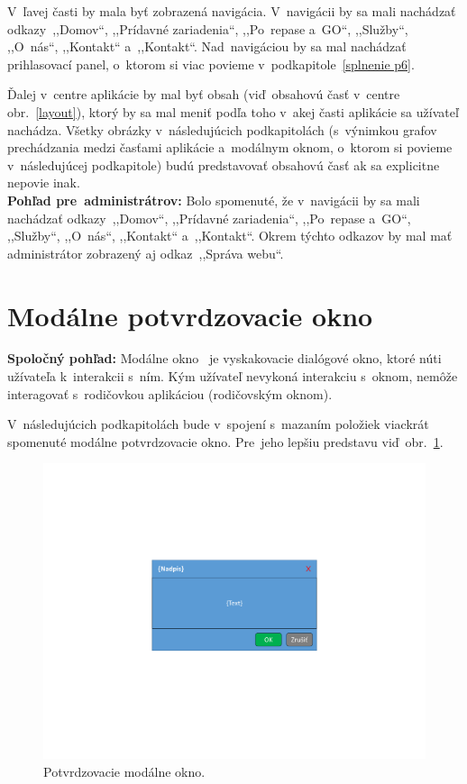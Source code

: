 V~ľavej časti by mala byť zobrazená navigácia. V~navigácii by sa mali nachádzať odkazy~,,Domov``, ,,Prídavné zariadenia``, ,,Po~repase a~GO``, ,,Služby``, ,,O~nás``, ,,Kontakt`` a~,,Kontakt``. Nad~navigáciou by sa mal nachádzať prihlasovací panel, o~ktorom si viac povieme v~podkapitole~\ref{splnenie p6}.

Ďalej v~centre aplikácie by mal byť obsah (viď~obsahovú časť v~centre obr.~\ref{layout}), ktorý by sa mal meniť podľa toho v~akej časti aplikácie sa užívateľ nachádza. Všetky obrázky v~následujúcich podkapitolách (s~výnimkou grafov prechádzania medzi časťami aplikácie a~modálnym oknom, o~ktorom si povieme v~následujúcej podkapitole) budú predstavovať obsahovú časť ak sa explicitne nepovie inak.\\

\textbf{Pohľad pre~administrátrov:} Bolo spomenuté, že v~navigácii by sa mali nachádzať odkazy~,,Domov``, ,,Prídavné zariadenia``, ,,Po~repase a~GO``, ,,Služby``, ,,O~nás``, ,,Kontakt`` a~,,Kontakt``. Okrem týchto odkazov by mal mať administrátor zobrazený aj odkaz~,,Správa webu``.

\section{Modálne potvrdzovacie okno}
\label{modalne potvrdzovacie okno}

\textbf{Spoločný pohľad:} Modálne okno~\cite{modalne okno} je vyskakovacie dialógové okno, ktoré núti užívateľa k~interakcii s~ním. Kým užívateľ nevykoná interakciu s~oknom, nemôže interagovať s~rodičovkou aplikáciou (rodičovským oknom).

V~následujúcich podkapitolách bude v~spojení s~mazaním položiek viackrát spomenuté modálne potvrdzovacie okno. Pre~jeho lepšiu predstavu viď~obr.~\ref{confirmation modal}.

\begin{figure}[H]\centering
\includegraphics[width=140mm]{../img/UI concept/confirmation modal}
\caption{Potvrdzovacie modálne okno.}
\label{confirmation modal}
\end{figure}

